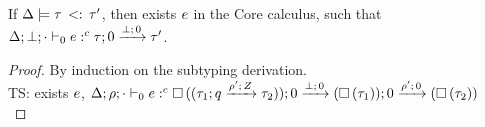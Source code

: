 \begin{lem}
\label{lem:coerse}
If $\Delta \models \sub{\type}{\type'} $, then exists $\expr$ in the Core calculus, 
such that $\Delta; \bot; \cdot \ctyping{0}{\expr}{\tarr{\type}{\type'}{0}{\bot}{0}} $.
\end{lem}
\begin{proof}
By induction on the subtyping derivation.\\
    TS: exists $\expr$,  $\Delta; \dmap; \cdot \ctyping{0}{\expr}{\tarr{ \tbox{(
          \tarr{\type_1}{\type_2}{\nnatbiA}{\dmap'}{\nnatA} )}  }{  \tarr{(\tbox{\type_1}) }{(\tbox{\type_2})}{0}{\dmap'}{0} }{0}{\bot}{0}} $
   \\
   
    
    
\end{proof}

